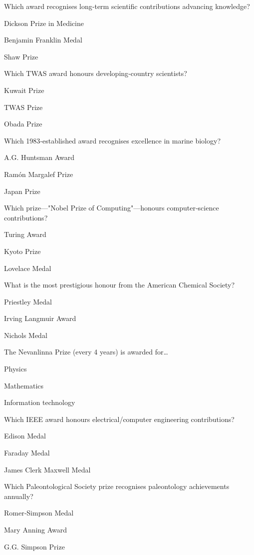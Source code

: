 \begin{enhancedmcq}{Which award recognises long‑term scientific contributions advancing knowledge?}
\item Dickson Prize in Medicine
\item Benjamin Franklin Medal
\item Shaw Prize

\end{enhancedmcq}
\begin{enhancedmcq}{Which TWAS award honours developing‑country scientists?}
\item Kuwait Prize
\item TWAS Prize
\item Obada Prize

\end{enhancedmcq}
\begin{enhancedmcq}{Which 1983‑established award recognises excellence in marine biology?}
\item A.G. Huntsman Award
\item Ramón Margalef Prize
\item Japan Prize

\end{enhancedmcq}
\begin{enhancedmcq}{Which prize—"Nobel Prize of Computing"—honours computer‑science contributions?}
\item Turing Award
\item Kyoto Prize
\item Lovelace Medal

\end{enhancedmcq}
\begin{enhancedmcq}{What is the most prestigious honour from the American Chemical Society?}
\item Priestley Medal
\item Irving Langmuir Award
\item Nichols Medal

\end{enhancedmcq}
\begin{enhancedmcq}{The Nevanlinna Prize (every 4 years) is awarded for…}
\item Physics
\item Mathematics
\item Information technology

\end{enhancedmcq}
\begin{enhancedmcq}{Which IEEE award honours electrical/computer engineering contributions?}
\item Edison Medal
\item Faraday Medal
\item James Clerk Maxwell Medal

\end{enhancedmcq}
\begin{enhancedmcq}{Which Paleontological Society prize recognises paleontology achievements annually?}
\item Romer‑Simpson Medal
\item Mary Anning Award
\item G.G. Simpson Prize
\end{enhancedmcq}